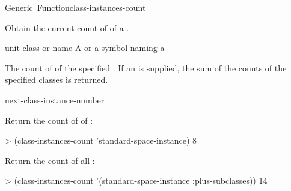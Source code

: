 \documentclass[10pt,twoside,english,pdftex]{article}
\begin{document}

\begin{functiondoc}{Generic~Function}{class-instances-count}%
  { 
    \returns{} }
%
%

\fnsyntax

\fnpurpose Obtain the current count of  of a
. 

\fnmethods
{}%
  {\code{(} 
  \returns{} } 
%
  {\code{(} 
  \returns{} } 
%
  {\code{(} 
  \returns{} }

\fnpackage {}

\fnmodule {}

\fnargs
\begin{args}{unit-class-or-name}
 A  or a symbol naming a
\end{args}

\fnreturns The count of  of the
specified .  If an
 is supplied, the sum of the
 counts of the specified classes is returned.

\begin{alsos}{next-class-instance-number}
\end{alsos}

\fnexamples
Return the count of  of
: 
%
\W\supp
\begin{example}
> (class-instances-count 'standard-space-instance)
8
\end{example} 
%
Return the count of all :
%
\W\supp\notpretop
\begin{example}
> (class-instances-count '(standard-space-instance :plus-subclasses))
14
\end{example} 

\end{functiondoc}

\end{document}
